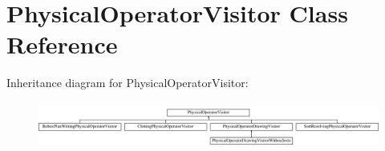 \hypertarget{class_physical_operator_visitor}{\section{Physical\+Operator\+Visitor Class Reference}
\label{class_physical_operator_visitor}
}
Inheritance diagram for Physical\+Operator\+Visitor\+:\begin{figure}[H]
\begin{center}
\leavevmode
\includegraphics[height=1.561338cm]{class_physical_operator_visitor}
\end{center}
\end{figure}
